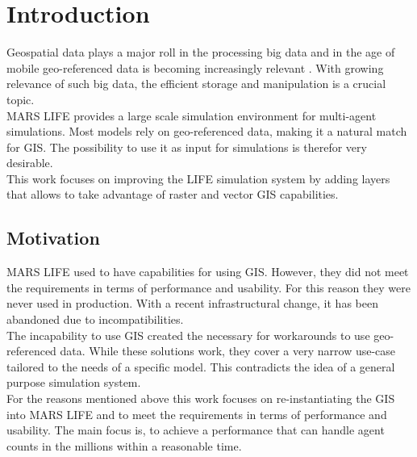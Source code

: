 
\chapter{Introduction}
Geospatial data plays a major roll in the processing big data and in the age of mobile geo-referenced data is becoming increasingly relevant \citep{Lee2015, Kitchin2013, Graham2013}. With growing relevance of such big data, the efficient storage and manipulation is a crucial topic.\\
MARS LIFE provides a large scale simulation environment for multi-agent simulations. Most models rely on geo-referenced data, making it a natural match for GIS. The possibility to use it as input for simulations is therefor very desirable.\\
This work focuses on improving the LIFE simulation system by adding layers that allows to take advantage of raster and vector GIS capabilities.



\section{Motivation}
MARS LIFE used to have capabilities for using GIS. However, they did not meet the requirements in terms of performance and usability. For this reason they were never used in production. With a recent infrastructural change, it has been abandoned due to incompatibilities.\\
The incapability to use GIS created the necessary for workarounds to use geo-referenced data. While these solutions work, they cover a very narrow use-case tailored to the needs of a specific model. This contradicts the idea of a general purpose simulation system.\\
For the reasons mentioned above this work focuses on re-instantiating the GIS into MARS LIFE and to meet the requirements in terms of performance and usability. The main focus is, to achieve a performance that can handle agent counts in the millions within a reasonable time.
